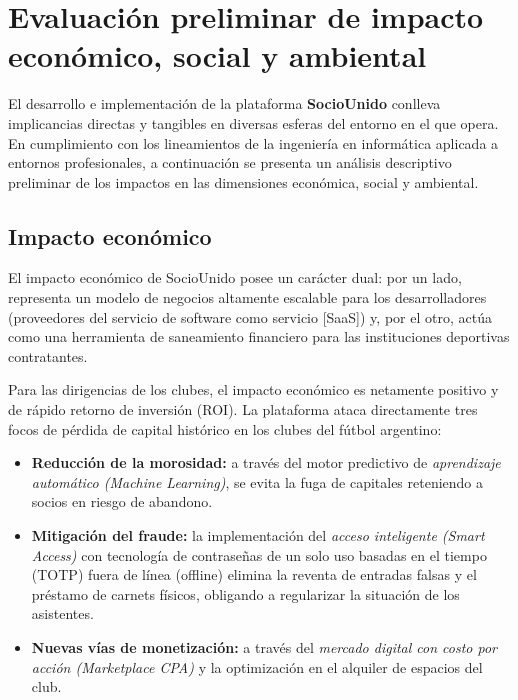\section{Evaluación preliminar de impacto económico, social y ambiental}

El desarrollo e implementación de la plataforma \textbf{SocioUnido} conlleva implicancias directas y tangibles en diversas esferas del entorno en el que opera. En cumplimiento con los lineamientos de la ingeniería en informática aplicada a entornos profesionales, a continuación se presenta un análisis descriptivo preliminar de los impactos en las dimensiones económica, social y ambiental.

\subsection{Impacto económico}

El impacto económico de SocioUnido posee un carácter dual: por un lado, representa un modelo de negocios altamente escalable para los desarrolladores (proveedores del servicio de software como servicio [SaaS]) y, por el otro, actúa como una herramienta de saneamiento financiero para las instituciones deportivas contratantes.

Para las dirigencias de los clubes, el impacto económico es netamente positivo y de rápido retorno de inversión (ROI). La plataforma ataca directamente tres focos de pérdida de capital histórico en los clubes del fútbol argentino:
\begin{itemize}
    \item \textbf{Reducción de la morosidad:} a través del motor predictivo de \textit{aprendizaje automático (Machine Learning)}, se evita la fuga de capitales reteniendo a socios en riesgo de abandono.
    \item \textbf{Mitigación del fraude:} la implementación del \textit{acceso inteligente (Smart Access)} con tecnología de contraseñas de un solo uso basadas en el tiempo (TOTP) fuera de línea (offline) elimina la reventa de entradas falsas y el préstamo de carnets físicos, obligando a regularizar la situación de los asistentes.
    \item \textbf{Nuevas vías de monetización:} a través del \textit{mercado digital con costo por acción (Marketplace CPA)} y la optimización en el alquiler de espacios del club.
\end{itemize}

